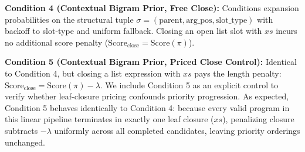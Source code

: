 \documentclass[10pt,twocolumn]{article}
\begin{document}
\textbf{Condition 4 (Contextual Bigram Prior, Free Close):} Conditions expansion probabilities on the structural tuple $\sigma = (\text{parent}, \text{arg\_pos}, \text{slot\_type})$ with backoff to slot-type and uniform fallback. Closing an open list slot with $xs$ incurs no additional score penalty ($\text{Score}_{\text{close}} = \text{Score}(\pi)$).

\textbf{Condition 5 (Contextual Bigram Prior, Priced Close Control):} Identical to Condition 4, but closing a list expression with $xs$ pays the length penalty: $\text{Score}_{\text{close}} = \text{Score}(\pi) - \lambda$. We include Condition 5 as an explicit control to verify whether leaf-closure pricing confounds priority progression. As expected, Condition 5 behaves identically to Condition 4: because every valid program in this linear pipeline terminates in exactly one leaf closure ($xs$), penalizing closure subtracts $-\lambda$ uniformly across all completed candidates, leaving priority orderings unchanged.
\end{document}
